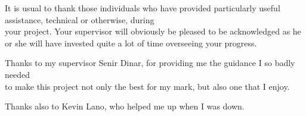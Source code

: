 It is usual to thank those individuals who have provided particularly useful assistance, technical or otherwise, during\\ your project. Your supervisor will obviously be pleased to be acknowledged as he or she will have invested quite a lot of time overseeing your progress.

Thanks to my supervisor Senir Dinar, for providing me the guidance I so badly needed\\ to make this project not only the best for my mark, but also one that I enjoy.

Thanks also to Kevin Lano, who helped me up when I was down.